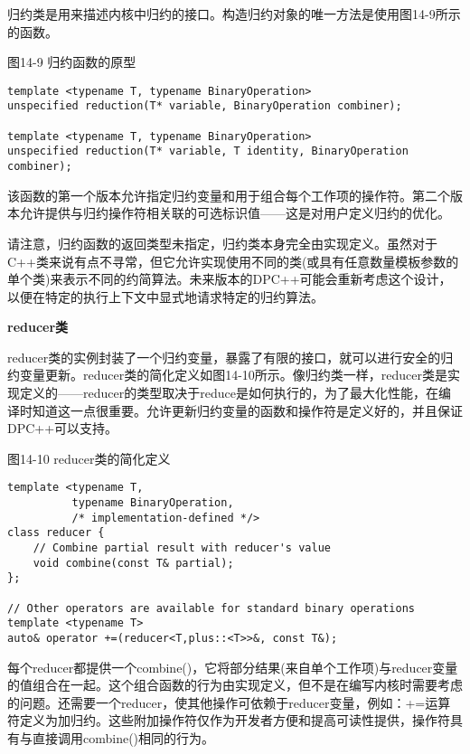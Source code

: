 归约类是用来描述内核中归约的接口。构造归约对象的唯一方法是使用图14-9所示的函数。\par

\hspace*{\fill} \par %
图14-9 归约函数的原型
\begin{lstlisting}[caption={}]
template <typename T, typename BinaryOperation>
unspecified reduction(T* variable, BinaryOperation combiner);

template <typename T, typename BinaryOperation>
unspecified reduction(T* variable, T identity, BinaryOperation combiner);
\end{lstlisting}

该函数的第一个版本允许指定归约变量和用于组合每个工作项的操作符。第二个版本允许提供与归约操作符相关联的可选标识值——这是对用户定义归约的优化。\par

请注意，归约函数的返回类型未指定，归约类本身完全由实现定义。虽然对于C++类来说有点不寻常，但它允许实现使用不同的类(或具有任意数量模板参数的单个类)来表示不同的约简算法。未来版本的DPC++可能会重新考虑这个设计，以便在特定的执行上下文中显式地请求特定的归约算法。\par

\hspace*{\fill} \par %
\textbf{reducer类}

reducer类的实例封装了一个归约变量，暴露了有限的接口，就可以进行安全的归约变量更新。reducer类的简化定义如图14-10所示。像归约类一样，reducer类是实现定义的——reducer的类型取决于reduce是如何执行的，为了最大化性能，在编译时知道这一点很重要。允许更新归约变量的函数和操作符是定义好的，并且保证DPC++可以支持。\par

\hspace*{\fill} \par %
图14-10 reducer类的简化定义
\begin{lstlisting}[caption={}]
template <typename T,
		  typename BinaryOperation,
	      /* implementation-defined */>
class reducer {
	// Combine partial result with reducer's value
	void combine(const T& partial);
};

// Other operators are available for standard binary operations
template <typename T>
auto& operator +=(reducer<T,plus::<T>>&, const T&);
\end{lstlisting}

每个reducer都提供一个combine()，它将部分结果(来自单个工作项)与reducer变量的值组合在一起。这个组合函数的行为由实现定义，但不是在编写内核时需要考虑的问题。还需要一个reducer，使其他操作可依赖于reducer变量，例如：+=运算符定义为加归约。这些附加操作符仅作为开发者方便和提高可读性提供，操作符具有与直接调用combine()相同的行为。\par

